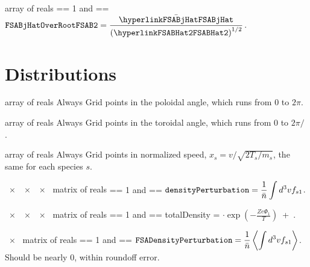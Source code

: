 \myhrule

{ array of reals}
{ == 1 and  == \true}
{$\displaystyle \text{\ttfamily FSABjHatOverRootFSAB2} =  \frac{\bar{\text{\parlink{FSABjHat}}}}{\left(\text{\parlink{FSABHat2}}\right)^{1/2}}$.}

\myhrule

\section{Distributions}
\label{sec:Distributions}

\myhrule

{ array of reals}
{Always}
{Grid points in the poloidal angle, which runs from $0$ to $2 \pi$.}

\myhrule

{ array of reals}
{Always}
{Grid points in the toroidal angle, which runs from $0$ to $2 \pi/$ .}

\myhrule

{ array of reals}
{Always}
{Grid points in normalized speed, $x_s = v / \sqrt{2 T_s / m_s}$, the same for each species $s$.}

\myhrule

{~$\times$~~$\times$~~$\times$~ matrix of reals}
{ == 1 and  == \true}
{$\displaystyle \text{\ttfamily densityPerturbation} =  \frac{1}{\bar{n}} \int d^3v f_{s1}$.}

\myhrule

{~$\times$~~$\times$~~$\times$~ matrix of reals}
{ == 1 and  == \true}
{{\ttfamily totalDensity} = $\cdot \exp \left(- \frac{Z e \Phi_1}{T}  \right)$~+~.}

\myhrule

{~$\times$~ matrix of reals}
{ == 1 and  == \true}
{$\displaystyle \text{\ttfamily FSADensityPerturbation} =  \frac{1}{\bar{n}} \left\langle \int d^3v f_{s1} \right\rangle$. 
Should be %
nearly 0, within roundoff error.}


